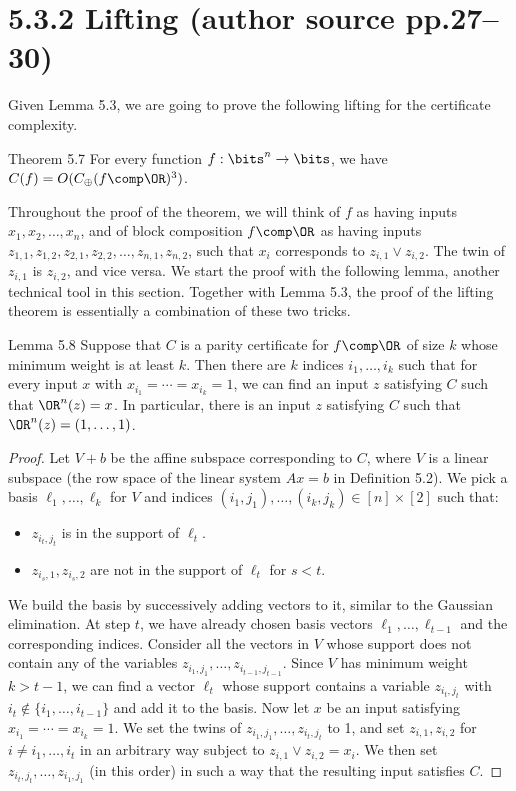 \section*{5.3.2 Lifting (author source pp.27--30)}
Given Lemma 5.3, we are going to prove the following lifting for the certificate complexity.
\begin{originalresult}{Theorem 5.7}
For every function $f:\bits^n\to\bits$, we have $C(f)=O(C_\oplus(f\comp\OR)^3)$.
\end{originalresult}
Throughout the proof of the theorem, we will think of $f$ as having inputs $x_1,x_2,\ldots,x_n$, and of block composition $f\comp\OR$ as having inputs $z_{1,1},z_{1,2},z_{2,1},z_{2,2},\ldots,z_{n,1},z_{n,2}$, such that $x_i$ corresponds to $z_{i,1}\vee z_{i,2}$. The twin of $z_{i,1}$ is $z_{i,2}$, and vice versa. We start the proof with the following lemma, another technical tool in this section. Together with Lemma 5.3, the proof of the lifting theorem is essentially a combination of these two tricks.
\begin{originalresult}{Lemma 5.8}
Suppose that $C$ is a parity certificate for $f\comp\OR$ of size $k$ whose minimum weight is at least $k$. Then there are $k$ indices $i_1,\ldots,i_k$ such that for every input $x$ with $x_{i_1}=\cdots=x_{i_k}=1$, we can find an input $z$ satisfying $C$ such that $\OR^n(z)=x$. In particular, there is an input $z$ satisfying $C$ such that $\OR^n(z)=(1,\ldots,1)$.
\end{originalresult}
\begin{proof}
Let $V+b$ be the affine subspace corresponding to $C$, where $V$ is a linear subspace (the row space of the linear system $Ax=b$ in Definition 5.2). We pick a basis $\ell_1,\ldots,\ell_k$ for $V$ and indices $(i_1,j_1),\ldots,(i_k,j_k)\in[n]\times[2]$ such that:
\begin{itemize}
\item $z_{i_t,j_t}$ is in the support of $\ell_t$.
\item $z_{i_s,1},z_{i_s,2}$ are not in the support of $\ell_t$ for $s<t$.
\end{itemize}
We build the basis by successively adding vectors to it, similar to the Gaussian elimination. At step $t$, we have already chosen basis vectors $\ell_1,\ldots,\ell_{t-1}$ and the corresponding indices. Consider all the vectors in $V$ whose support does not contain any of the variables $z_{i_1,j_1},\ldots,z_{i_{t-1},j_{t-1}}$. Since $V$ has minimum weight $k>t-1$, we can find a vector $\ell_t$ whose support contains a variable $z_{i_t,j_t}$ with $i_t\notin\{i_1,\ldots,i_{t-1}\}$ and add it to the basis.
Now let $x$ be an input satisfying $x_{i_1}=\cdots=x_{i_k}=1$. We set the twins of $z_{i_1,j_1},\ldots,z_{i_t,j_t}$ to 1, and set $z_{i,1},z_{i,2}$ for $i\ne i_1,\ldots,i_t$ in an arbitrary way subject to $z_{i,1}\vee z_{i,2}=x_i$. We then set $z_{i_t,j_t},\ldots,z_{i_1,j_1}$ (in this order) in such a way that the resulting input satisfies $C$.
\end{proof}
